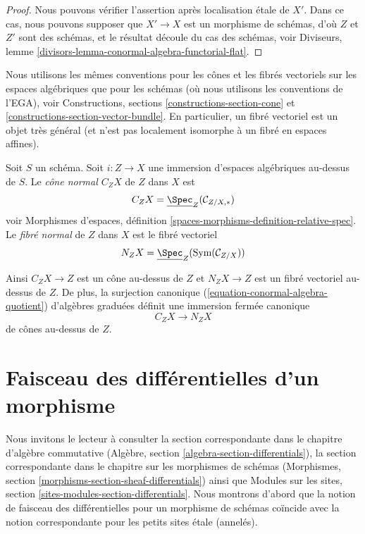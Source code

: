 \begin{proof}
Nous pouvons vérifier l'assertion après localisation \'etale de $X'$.
Dans ce cas, nous pouvons supposer que $X' \to X$ est un morphisme de schémas,
d'où $Z$ et $Z'$ sont des schémas, et le résultat découle
du cas des schémas, voir
Diviseurs, lemme \ref{divisors-lemma-conormal-algebra-functorial-flat}.
\end{proof}

\noindent
Nous utilisons les mêmes conventions pour les cônes et les fibrés vectoriels sur
les espaces algébriques que pour les schémas (où nous utilisons
les conventions de l'EGA), voir
Constructions, sections \ref{constructions-section-cone} et
\ref{constructions-section-vector-bundle}.
En particulier, un fibré vectoriel est un objet très général
(et n'est pas localement isomorphe à un fibré en espaces affines).

\begin{definition}
\label{definition-normal-cone}
Soit $S$ un schéma. Soit $i : Z \to X$ une immersion d'espaces algébriques
au-dessus de $S$. Le {\it cône normal $C_ZX$} de $Z$ dans $X$ est
$$
C_ZX = \underline{\Spec}_Z(\mathcal{C}_{Z/X, *})
$$
voir Morphismes d'espaces,
définition \ref{spaces-morphisms-definition-relative-spec}. Le
{\it fibré normal} de $Z$ dans $X$ est le fibré vectoriel
$$
N_ZX = \underline{\Spec}_Z(\text{Sym}(\mathcal{C}_{Z/X}))
$$
\end{definition}

\noindent
Ainsi $C_ZX \to Z$ est un cône au-dessus de $Z$ et $N_ZX \to Z$ est un fibré vectoriel
au-dessus de $Z$. De plus, la surjection canonique
(\ref{equation-conormal-algebra-quotient}) d'algèbres graduées
définit une immersion fermée canonique
\begin{equation}
\label{equation-normal-cone-in-normal-bundle}
C_ZX \longrightarrow N_ZX
\end{equation}
de cônes au-dessus de $Z$.










\section{Faisceau des différentielles d'un morphisme}
\label{section-sheaf-differentials}

\noindent
Nous invitons le lecteur à consulter la section correspondante
dans le chapitre d'algèbre commutative
(Algèbre, section \ref{algebra-section-differentials}),
la section correspondante dans le chapitre sur les morphismes de schémas
(Morphismes, section \ref{morphisms-section-sheaf-differentials})
ainsi que
Modules sur les sites, section \ref{sites-modules-section-differentials}.
Nous montrons d'abord que la notion de faisceau des différentielles pour un
morphisme de schémas coïncide avec la notion correspondante pour les
petits sites \'etale (annelés).

